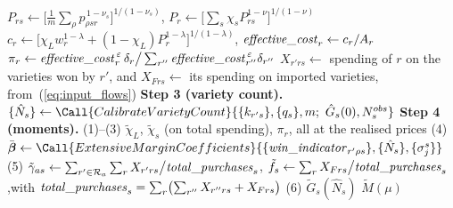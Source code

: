 \begin{algorithm}[H]
\begin{algorithmic}[1]
\State \quad $P_{rs}\gets\bigl[\tfrac1m\sum_{\rho}p_{\rho s r}^{\,1-\nu_s}\bigr]^{1/(1-\nu_s)}$,\quad
  $P_r\gets\bigl[\sum_s\chi_s P_{rs}^{1-\nu}\bigr]^{1/(1-\nu)}$
\State \quad $c_r\gets\bigl[\chi_L w_r^{1-\lambda}+(1-\chi_L)P_r^{1-\lambda}\bigr]^{1/(1-\lambda)}$,\quad
  $\mathit{effective\_cost}_r\gets c_r/A_r$
\State \quad $\pi_r\gets \mathit{effective\_cost}_r^{\,\varepsilon}\,\delta_r\big/\sum_{r''}\mathit{effective\_cost}_{r''}^{\,\varepsilon}\delta_{r''}$
\State \quad $X_{r'rs}\gets$ spending of $r$ on the varieties won by $r'$, and $X_{Frs}\gets$ its spending on imported varieties,
  from~(\ref{eq:input_flows})
\vspace{2pt}
\State \textbf{Step 3 (variety count).}
\State \quad $\{\hat{N}_s\}\gets\Call{CalibrateVarietyCount}{\{k_{r's}\},\{q_s\},m;\ \hat{G}_s(0),N^{obs}_s}$
\vspace{2pt}
\State \textbf{Step 4 (moments).}
\State \quad (1)--(3) $\tilde\chi_L$, $\tilde\chi_s$ (on total spending), $\pi_r$, all at the realised prices
\State \quad (4) $\bar{\boldsymbol\beta}\gets\Call{ExtensiveMarginCoefficients}{\{\var{win\_indicator}_{r'\rho s}\},\{\hat N_s\},\{\sigma^s_j\}}$
\State \quad (5) $\tilde{\gamma}_{as}\gets\sum_{r'\in\mathcal{R}_a}\sum_r X_{r'rs}\big/\mathit{total\_purchases}_s$,\quad
  $\tilde f_s\gets\sum_r X_{Frs}\big/\mathit{total\_purchases}_s$,\quad with $\mathit{total\_purchases}_s=\sum_r\bigl(\sum_{r''}X_{r''rs}+X_{Frs}\bigr)$
\State \quad (6) $\tilde{G}_s(\hat{N}_s)$
\State \Return $\tilde{M}(\mu)$
\end{algorithmic}
\end{algorithm}

